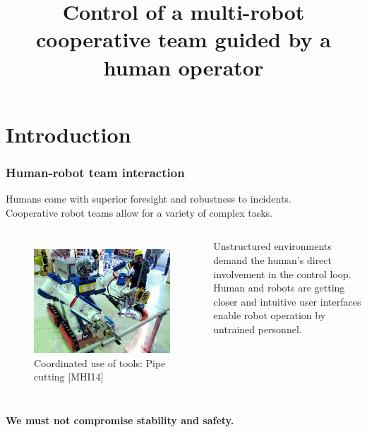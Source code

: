 \documentclass[student]{ITRslides}
\title{Control of a multi-robot cooperative team guided by a human operator}
\begin{document}
\begin{frame}
    \titlepage
\end{frame}


\section{Introduction}

\begin{frame}
	\frametitle{Human-robot team interaction}
	Humans come with superior foresight and robustness to incidents.\\ 
	Cooperative robot teams allow for a variety of complex tasks.
		\begin{columns}[T]
	
			\begin{figure}
			
			\includegraphics[width=1\textwidth]{mhi-meister45.jpg}\\
			\scriptsize{Coordinated use of tools: Pipe cutting}\nocite{MHI-MEISTeR}{\tiny{ [MHI14]}} 
			\end{figure}
		
		\vspace{10pt}
		Unstructured environments demand the human's direct 						involvement in the control loop.\\
		\vspace{10pt}
		Human and robots are getting closer and intuitive user interfaces enable robot operation by untrained personnel.\\
		 

		\end{columns}
		\vspace{12pt}
		\textbf{We must not compromise stability and safety.}
 
		
			

\end{frame}
\end{document}

